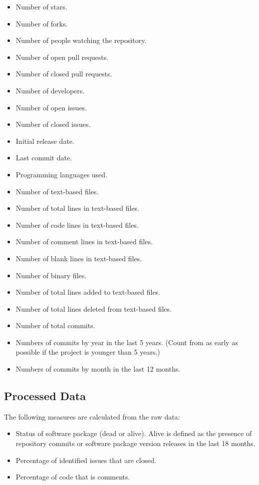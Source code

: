 \documentclass[letterpaper,cleveref]{lipics-v2019}
\theoremstyle{definition}
\begin{document}
\begin{itemize}
\item Number of stars.
\item Number of forks.
\item Number of people watching the repository.
\item Number of open pull requests.
\item Number of closed pull requests.	
\item Number of developers.	
\item Number of open issues.
\item Number of closed issues.
\item Initial release date.
\item Last commit date.
\item Programming languages used.
\item Number of text-based files.
\item Number of total lines in text-based files.
\item Number of code lines in text-based files.
\item Number of comment lines in text-based files.
\item Number of blank lines in text-based files.
\item Number of binary files.  
\item Number of total lines added to text-based files.
\item Number of total lines deleted from text-based files.
\item Number of total commits.
\item Numbers of commits by year in the last 5 years. (Count from as early as possible if the project is younger than 5 years.) 
\item Numbers of commits by month in the last 12 months.
\end{itemize}

\subsection{Processed Data}\label{processeddata}

The following measures are calculated from the raw data:

\begin{itemize}
\item Status of software package (dead or alive). Alive is defined as the
  presence of repository commits or software package version releases in the
  last 18 months.
\item Percentage of identified issues that are closed.
\item Percentage of code that is comments.
\end{itemize}
\end{document}
